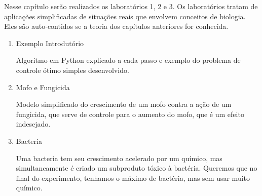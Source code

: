 Nesse capítulo serão realizados os laboratórios 1, 2 e 3. Os laboratórios
tratam de aplicações simplificadas de situações reais que envolvem conceitos
de biologia. Eles são auto-contidos se a teoria dos capítulos
anteriores for conhecida. 

\begin{enumerate}[label=\textbf{Lab \arabic*:}]
    \item Exemplo Introdutório
    
    Algoritmo em Python explicado a cada passo e exemplo do problema de
    controle ótimo simples desenvolvido. 

    \item Mofo e Fungicida 
    
    Modelo simplificado do crescimento de um mofo contra a ação de um
    fungicida, que serve de controle para o aumento do mofo, que é um efeito
    indesejado. 

    \item Bacteria 
    
    Uma bacteria tem seu crescimento acelerado por um químico, mas
    simultaneamente é criado um subproduto tóxico à bactéria. Queremos que no
    final do experimento, tenhamos o máximo de bactéria, mas sem usar muito
    químico. 
\end{enumerate}